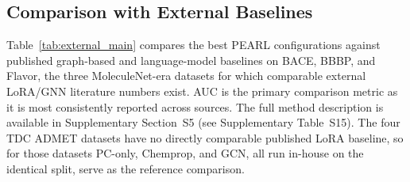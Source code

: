 \documentclass[pdflatex,sn-mathphys-num,Numbered]{sn-jnl}%
\begin{document}
\FloatBarrier
\subsection{Comparison with External Baselines}\label{sec:external_comparison}
Table~\ref{tab:external_main} compares the best PEARL configurations against published graph-based and language-model baselines on BACE, BBBP, and Flavor, the three MoleculeNet-era datasets for which comparable external LoRA/GNN literature numbers exist. AUC is the primary comparison metric as it is most consistently reported across sources. The full method description is available in Supplementary Section~S5 (see Supplementary Table~S15). The four TDC ADMET datasets have no directly comparable published LoRA baseline, so for those datasets PC-only, Chemprop, and GCN, all run in-house on the identical split, serve as the reference comparison.
\end{document}
